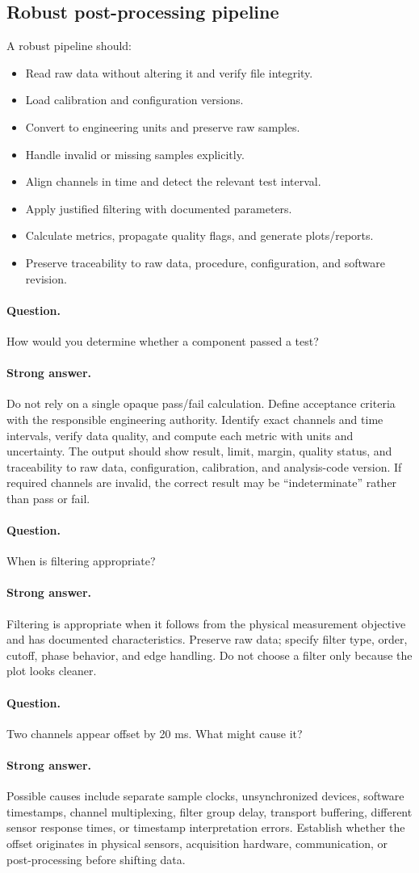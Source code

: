 \documentclass[11pt]{article}
\newcommand{\q}[1]{\paragraph{Question.} #1}
\newcommand{\ans}[1]{\paragraph{Strong answer.} #1}
\begin{document}
\subsection{Robust post-processing pipeline}
A robust pipeline should:
\begin{itemize}
  \item Read raw data without altering it and verify file integrity.
  \item Load calibration and configuration versions.
  \item Convert to engineering units and preserve raw samples.
  \item Handle invalid or missing samples explicitly.
  \item Align channels in time and detect the relevant test interval.
  \item Apply justified filtering with documented parameters.
  \item Calculate metrics, propagate quality flags, and generate plots/reports.
  \item Preserve traceability to raw data, procedure, configuration, and software revision.
\end{itemize}

\q{How would you determine whether a component passed a test?}
\ans{Do not rely on a single opaque pass/fail calculation. Define acceptance
criteria with the responsible engineering authority. Identify exact channels and
time intervals, verify data quality, and compute each metric with units and
uncertainty. The output should show result, limit, margin, quality status, and
traceability to raw data, configuration, calibration, and analysis-code version.
If required channels are invalid, the correct result may be ``indeterminate''
rather than pass or fail.}

\q{When is filtering appropriate?}
\ans{Filtering is appropriate when it follows from the physical measurement
objective and has documented characteristics. Preserve raw data; specify filter
type, order, cutoff, phase behavior, and edge handling. Do not choose a filter
only because the plot looks cleaner.}

\q{Two channels appear offset by 20 ms. What might cause it?}
\ans{Possible causes include separate sample clocks, unsynchronized devices,
software timestamps, channel multiplexing, filter group delay, transport
buffering, different sensor response times, or timestamp interpretation errors.
Establish whether the offset originates in physical sensors, acquisition
hardware, communication, or post-processing before shifting data.}
\end{document}
